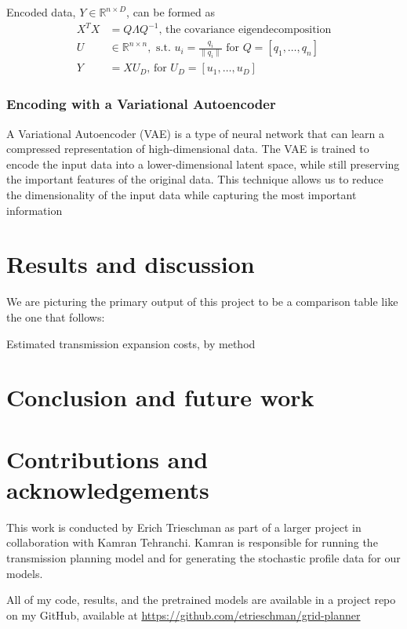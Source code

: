 \documentclass[10pt,twocolumn,letterpaper]{article}
\begin{document}
Encoded data, $Y \in \mathbb{R}^{n\times D}$, can be formed as 
\begin{align*}
    X^TX &= Q\Lambda Q^{-1} \textrm{, the covariance eigendecomposition}\\
    U &\in \mathbb{R}^{n\times n}, \textrm{ s.t. } u_i = \frac{q_i}{\lVert q_i \rVert} \textrm{ for } Q = [q_1, \dots, q_n]\\
    Y &= XU_D \textrm{, for } U_D = [u_1, \dots, u_D]
\end{align*}

\subsubsection{Encoding with a Variational Autoencoder}
A Variational Autoencoder (VAE) is a type of neural network that can learn a compressed representation of high-dimensional data. The VAE is trained to encode the input data into a lower-dimensional latent space, while still preserving the important features of the original data. This technique allows us to reduce the dimensionality of the input data while capturing the most important information \cite{odaibo2019tutorial}


\section{Results and discussion}
\label{sec:results}

We are picturing the primary output of this project to be a comparison table like the one that follows:
\begin{table}[!htbp]
    \tiny
    \begin{center}
        \caption{\label{fig:summ} Estimated transmission expansion costs, by method}
        
    \end{center}
\end{table}

\section{Conclusion and future work}
\label{sec:conclusion}


\section{Contributions and acknowledgements}
\label{sec:contrib}
This work is conducted by Erich Trieschman as part of a larger project in collaboration with Kamran Tehranchi. Kamran is responsible for running the transmission planning model and for generating the stochastic profile data for our models. 

All of my code, results, and the pretrained models are available in a project repo on my GitHub, available at \url{https://github.com/etrieschman/grid-planner}

{\small


}
\end{document}
